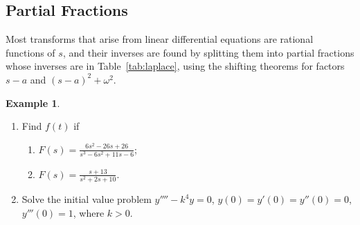 \documentclass[11pt,a4paper]{article}
\theoremstyle{definition}
\newtheorem{exa}[thm]{Example}
\begin{document}
{\color[wave]{485}\subsection{Partial Fractions}}

Most transforms that arise from linear differential equations are rational
functions of $s$, and their inverses are found by splitting them into partial
fractions whose inverses are in Table~\ref{tab:laplace}, using the shifting
theorems for factors $s - a$ and $(s - a)^2 + \omega^2$.

\begin{exa}
\label{ex:partialfractions}
\begin{enumerate}
\item Find $f(t)$ if
\begin{enumerate}
\item $F(s) = \frac{6s^2 -26s + 26}{s^3 - 6s^2 + 11s -6}$;

\item $F(s) = \frac{s + 13}{s^2 + 2s + 10}$.
\end{enumerate}
\item Solve the initial value problem $y'''' - k^4y = 0$,
$y(0) =y'(0) =y''(0)=0$, $y'''(0) =1$, where $k>0$.
\end{enumerate}
\end{exa}
\end{document}
